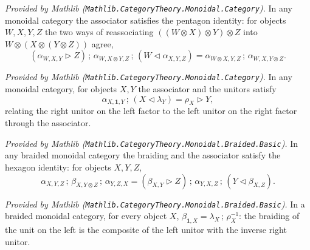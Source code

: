 \begin{lemma}
  \label{lem:monoidal_pentagon_mathlib}
  \mathlibok
  \textit{Provided by Mathlib (\texttt{Mathlib.CategoryTheory.Monoidal.Category}).}
  In any monoidal category the associator satisfies the pentagon identity: for
  objects \(W, X, Y, Z\) the two ways of reassociating
  \(((W \otimes X) \otimes Y) \otimes Z\) into
  \(W \otimes (X \otimes (Y \otimes Z))\) agree,
  \[
    (\alpha_{W,X,Y} \rhd Z) \,;\, \alpha_{W, X \otimes Y, Z}
      \,;\, (W \lhd \alpha_{X,Y,Z})
      = \alpha_{W \otimes X, Y, Z} \,;\, \alpha_{W, X, Y \otimes Z}.
  \]
\end{lemma}

\begin{lemma}
  \label{lem:monoidal_triangle_mathlib}
  \mathlibok
  \textit{Provided by Mathlib (\texttt{Mathlib.CategoryTheory.Monoidal.Category}).}
  In any monoidal category, for objects \(X, Y\) the associator and the unitors
  satisfy
  \[
    \alpha_{X, \mathbf{1}, Y} \,;\, (X \lhd \lambda_Y) = \rho_X \rhd Y,
  \]
  relating the right unitor on the left factor to the left unitor on the right
  factor through the associator.
\end{lemma}

\begin{lemma}
  \label{lem:braided_hexagon_mathlib}
  \mathlibok
  \textit{Provided by Mathlib
  (\texttt{Mathlib.CategoryTheory.Monoidal.Braided.Basic}).}
  In any braided monoidal category the braiding and the associator satisfy the
  hexagon identity: for objects \(X, Y, Z\),
  \[
    \alpha_{X,Y,Z} \,;\, \beta_{X, Y \otimes Z} \,;\, \alpha_{Y,Z,X}
      = (\beta_{X,Y} \rhd Z) \,;\, \alpha_{Y,X,Z}
        \,;\, (Y \lhd \beta_{X,Z}).
  \]
\end{lemma}

\begin{lemma}
  \label{lem:braiding_tensorUnit_left_mathlib}
  \mathlibok
  \textit{Provided by Mathlib
  (\texttt{Mathlib.CategoryTheory.Monoidal.Braided.Basic}).}
  In a braided monoidal category, for every object \(X\),
  \(\beta_{\mathbf{1}, X} = \lambda_X \,;\, \rho_X^{-1}\): the braiding of the unit
  on the left is the composite of the left unitor with the inverse right unitor.
\end{lemma}

